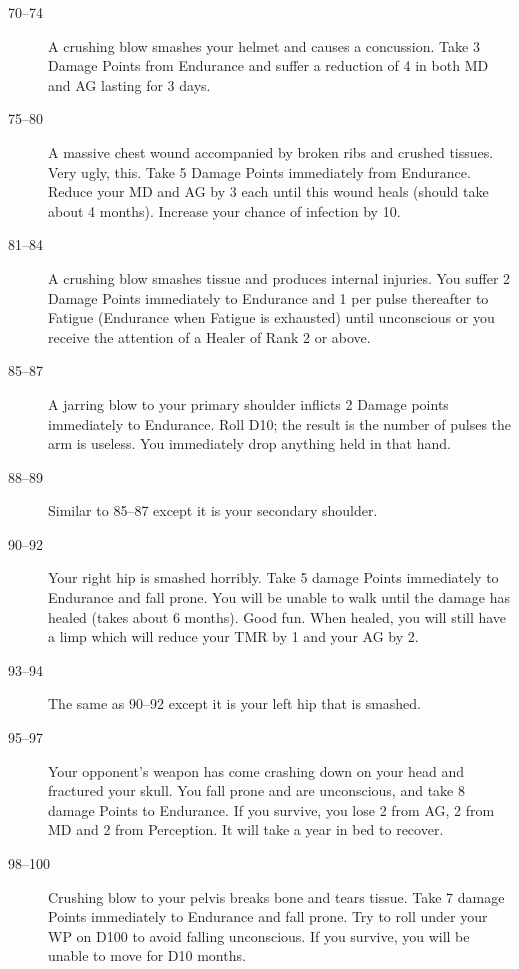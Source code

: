 \begin{multicols}{3}
{\begin{description}
\item[70--74] A crushing blow smashes your helmet and causes a
concussion.  Take 3 Damage Points from Endurance and suffer a
reduction of 4 in both MD and AG lasting for 3 days.

\item[75--80] A massive chest wound accompanied by broken ribs and
crushed tissues.  Very ugly, this.  Take 5 Damage Points immediately
from Endurance.  Reduce your MD and AG by 3 each until this wound
heals (should take about 4 months).  Increase your chance of infection
by 10.

\item[81--84] A crushing blow smashes tissue and produces internal
injuries.  You suffer 2 Damage Points immediately to Endurance and 1
per pulse thereafter to Fatigue (Endurance when Fatigue is exhausted)
until unconscious or you receive the attention of a Healer of Rank 2
or above.

\item[85--87] A jarring blow to your primary shoulder inflicts 2 Damage
points immediately to Endurance.  Roll D10; the result is the number
of pulses the arm is useless.  You immediately drop anything held in
that hand.

\item[88--89] Similar to 85--87 except it is your secondary shoulder.

\item[90--92] Your right hip is smashed horribly.  Take 5 damage
Points immediately to Endurance and fall prone.  You will be unable to
walk until the damage has healed (takes about 6 months).  Good fun.
When healed, you will still have a limp which will reduce your TMR by
1 and your AG by 2.

\item[93--94] The same as 90--92 except it is your left hip that is
smashed.

\item[95--97] Your opponent's weapon has come crashing down on your
head and fractured your skull.  You fall prone and are unconscious,
and take 8 damage Points to Endurance.  If you survive, you lose 2
from AG, 2 from MD and 2 from Perception.  It will take a year in bed
to recover.

\item[98--100] Crushing blow to your pelvis breaks bone and tears
tissue.  Take 7 damage Points immediately to Endurance and fall
prone.  Try to roll under your WP on D100 to avoid falling
unconscious.  If you survive, you will be unable to move for D10
months.
\end{description}}


\end{multicols}
